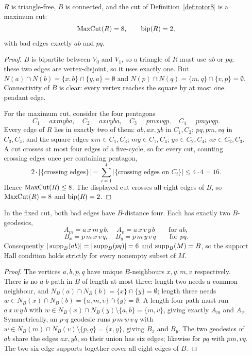 \begin{proposition}\label{prop:rotor8-maxcut}
\(R\) is triangle-free, \(B\) is connected, and the cut of
Definition~\ref{def:rotor8} is a maximum cut:
\[
 \operatorname{MaxCut}(R)=8,\qquad \operatorname{bip}(R)=2,
\]
with bad edges exactly \(ab\) and \(pq\).
\end{proposition}

\begin{proof}
\(B\) is bipartite between \(V_0\) and \(V_1\), so a triangle of \(R\)
must use \(ab\) or \(pq\); these two edges are vertex-disjoint, so it
uses exactly one. But \(N(a)\cap N(b)=\{x,b\}\cap\{y,a\}=\emptyset\)
and \(N(p)\cap N(q)=\{m,q\}\cap\{v,p\}=\emptyset\). Connectivity of
\(B\) is clear: every vertex reaches the square by at most one pendant
edge.

For the maximum cut, consider the four pentagons
\[
 C_1=axmyba,\quad C_2=axvyba,\quad C_3=pmxvqp,\quad C_4=pmyvqp.
\]
Every edge of \(R\) lies in exactly two of them: \(ab,ax,yb\) in
\(C_1,C_2\); \(pq,pm,vq\) in \(C_3,C_4\); and the square edges
\(xm\in C_1,C_3\); \(my\in C_1,C_4\); \(yv\in C_2,C_4\);
\(vx\in C_2,C_3\). A cut crosses at most four edges of a five-cycle,
so for every cut, counting crossing edges once per containing pentagon,
\[
 2\cdot|\{\text{crossing edges}\}|
 =\sum_{i=1}^{4}|\{\text{crossing edges on }C_i\}|\le 4\cdot4=16 .
\]
Hence \(\operatorname{MaxCut}(R)\le8\). The displayed cut crosses all eight edges of
\(B\), so \(\operatorname{MaxCut}(R)=8\) and \(\operatorname{bip}(R)=2\).
\end{proof}

\begin{lemma}\label{lem:rotor8-geodesics}
In the fixed cut, both bad edges have \(B\)-distance four. Each has
exactly two \(B\)-geodesics,
\[
 A_m=a\,x\,m\,y\,b,\quad A_v=a\,x\,v\,y\,b \qquad\text{for } ab,
\]
\[
 B_x=p\,m\,x\,v\,q,\quad B_y=p\,m\,y\,v\,q \qquad\text{for } pq.
\]
Consequently \(|\operatorname{supp}_B(ab)|=|\operatorname{supp}_B(pq)|=6\) and
\(\operatorname{supp}_B(M)=B\), so the support Hall condition holds strictly for
every nonempty subset of \(M\).
\end{lemma}

\begin{proof}
The vertices \(a,b,p,q\) have unique \(B\)-neighbours \(x,y,m,v\)
respectively. There is no \(a\)-\(b\) path in \(B\) of length at most
three: length two needs a common neighbour, and
\(N_B(a)\cap N_B(b)=\{x\}\cap\{y\}=\emptyset\); length three needs
\(w\in N_B(x)\cap N_B(b)=\{a,m,v\}\cap\{y\}=\emptyset\). A length-four
path must run \(a\,x\,w\,y\,b\) with
\(w\in N_B(x)\cap N_B(y)\setminus\{a,b\}=\{m,v\}\), giving exactly
\(A_m\) and \(A_v\). Symmetrically, an \(p\)-\(q\) geodesic runs
\(p\,m\,w\,v\,q\) with \(w\in N_B(m)\cap N_B(v)\setminus\{p,q\}
=\{x,y\}\), giving \(B_x\) and \(B_y\). The two geodesics of \(ab\)
share the edges \(ax,yb\), so their union has six edges; likewise for
\(pq\) with \(pm,vq\). The two six-edge supports together cover all
eight edges of \(B\).
\end{proof}

